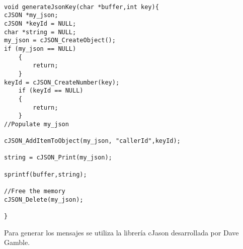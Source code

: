 \begin{lstlisting}[label=cod: generación de mensaje,caption= Función que genera el payload]

void generateJsonKey(char *buffer,int key){
cJSON *my_json;
cJSON *keyId = NULL;
char *string = NULL;    
my_json = cJSON_CreateObject();
if (my_json == NULL)
    {
        return;
    }
keyId = cJSON_CreateNumber(key);
    if (keyId == NULL)
    {
        return;
    }    
//Populate my_json

cJSON_AddItemToObject(my_json, "callerId",keyId);

string = cJSON_Print(my_json);

sprintf(buffer,string);

//Free the memory
cJSON_Delete(my_json);

}

\end{lstlisting}

Para generar los mensajes se utiliza la librería cJason desarrollada por Dave Gamble.